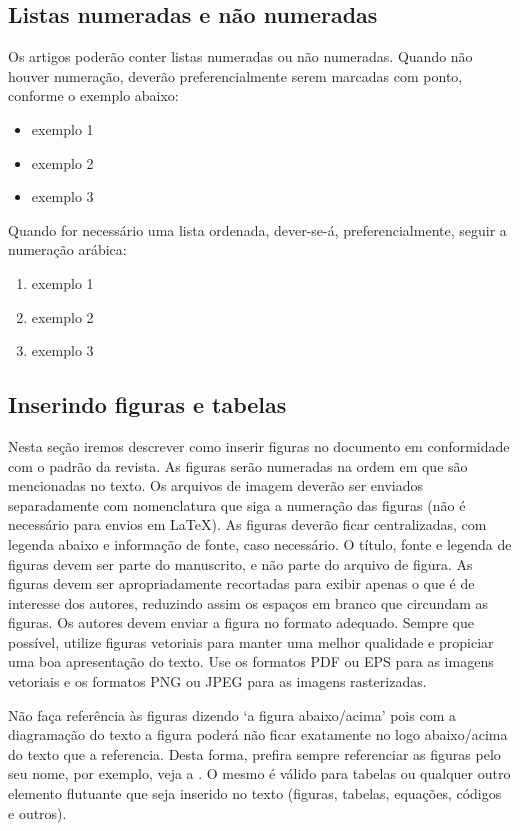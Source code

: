 \documentclass{textolivre}
\begin{document}
\lipsum

\subsection{Listas numeradas e não numeradas}\label{sec-listas}
Os artigos poderão conter listas numeradas ou não numeradas.  
Quando não houver numeração, deverão preferencialmente serem marcadas com ponto, conforme o exemplo abaixo: 
\begin{itemize}
\item exemplo 1
\item exemplo 2
\item exemplo 3
\end{itemize}
\lipsum[2]

Quando for necessário uma lista ordenada, dever-se-á, preferencialmente, seguir a numeração arábica:
\begin{enumerate}
\item exemplo 1
\item exemplo 2
\item exemplo 3
\end{enumerate}
\lipsum[3-4]


\subsection{Inserindo figuras e tabelas}\label{sec-figuras-tabelas}
Nesta seção iremos descrever como inserir figuras no documento em conformidade com o padrão da revista. 
As figuras serão numeradas na ordem em que são mencionadas no texto. Os arquivos de imagem deverão
ser enviados separadamente com nomenclatura que siga a numeração das figuras (não é necessário para envios em \LaTeX{}).
As figuras deverão ficar centralizadas, com legenda abaixo e informação de fonte, caso necessário.
O título, fonte e legenda de figuras devem ser parte do manuscrito, e não parte do arquivo de figura.
As figuras devem ser apropriadamente recortadas para exibir apenas o que é de interesse dos autores,
reduzindo assim os espaços em branco que circundam as figuras.
Os autores devem enviar a figura no formato adequado. 
Sempre que possível, utilize figuras vetoriais para manter uma melhor qualidade e propiciar uma boa apresentação do texto. 
Use os formatos PDF ou EPS para as imagens vetoriais e os formatos PNG ou JPEG para as imagens rasterizadas. 

Não faça referência às figuras dizendo `a figura abaixo/acima' pois com a diagramação do texto a figura poderá não ficar exatamente no logo abaixo/acima do texto que a referencia.
Desta forma, prefira sempre referenciar as figuras pelo seu nome, por exemplo, veja a . O mesmo é válido para tabelas ou qualquer outro elemento flutuante 
que seja inserido no texto (figuras, tabelas, equações, códigos e outros).
\end{document}
